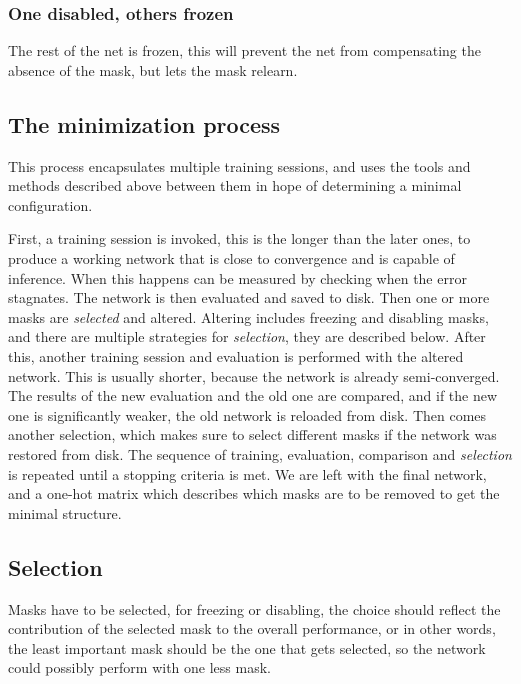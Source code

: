\documentclass[12pt]{report}
\begin{document}
\subsubsection{One disabled, others frozen}The rest of the net is frozen, this will prevent the net from compensating the absence of the mask, but lets the mask relearn.
\subsection{The minimization process}
This process encapsulates multiple training sessions, and uses the tools and methods described above between them in hope of determining a minimal configuration.\par
First, a training session is invoked, this is the longer than the later ones, to produce a working network that is close to convergence and is capable of inference. When this happens can be measured by checking when the error stagnates. The network is then evaluated and saved to disk. Then one or more masks are \textit{selected} and altered. Altering includes freezing and disabling masks, and there are multiple strategies for \textit{selection}, they are described below. After this, another training session and evaluation is performed with the altered network. This is usually shorter, because the network is already semi-converged. The results of the new evaluation and the old one are compared, and if the new one is significantly weaker, the old network is reloaded from disk. Then comes another selection, which makes sure to select different masks if the network was restored from disk. The sequence of training, evaluation, comparison and \textit{selection} is repeated until a stopping criteria is met. We are left with the final network, and a one-hot matrix which describes which masks are to be removed to get the minimal structure.
\subsection{Selection}
Masks have to be selected, for freezing or disabling, the choice should reflect the contribution of the selected mask to the overall performance, or in other words, the least important mask should be the one that gets selected, so the network could possibly perform with one less mask.
\end{document}
